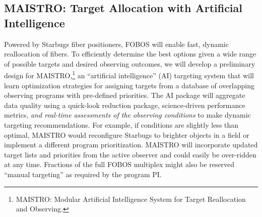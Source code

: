 

\subsection{MAISTRO: Target Allocation with Artificial Intelligence}
\label{sec:targeting}

 Powered by Starbugs fiber positioners, FOBOS
will enable fast, dynamic reallocation of fibers. To efficiently
determine the best options given a wide range of possible targets and
desired observing outcomes, we will develop a preliminary design for
MAISTRO,\footnote{MAISTRO: Modular Artificial Intelligence System for
Target Reallocation and Observing.} an ``artificial intelligence''
(AI) targeting system that will learn optimization strategies for
assigning targets from a database of overlapping observing programs
with pre-defined priorities. The AI package will aggregate data
quality using a quick-look reduction package, science-driven
performance metrics, {\it and real-time assessments of the observing
conditions} to make dynamic targeting recommendations. For example,
if conditions are slightly less than optimal, MAISTRO would
reconfigure Starbugs to brighter objects in a field or implement a
different program prioritization. MAISTRO will incorporate updated
target lists and priorities from the active observer and could easily
be over-ridden at any time. Fractions of the full FOBOS multiplex
might also be reserved ``manual targeting'' as required by the
program PI.



